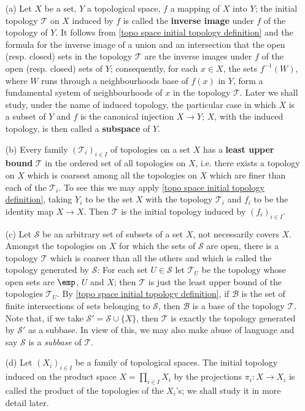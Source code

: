 \begin{example}
\mbox{}
\begin{enumerate}
\item[(a)] Let $X$ be a set, $Y$ a topological space, $f$ a mapping of $X$ into $Y$; the initial topology $\mathcal{T}$ on $X$ induced by $f$ is called the \textbf{inverse image} under $f$ of the topology of $Y$. It follows from \cref{topo space initial topology definition} and the formula for the inverse image of a union and an intersection that the open (resp. closed) sets in the topology $\mathcal{T}$ are the inverse images under $f$ of the open (resp. closed) sets of $Y$; consequently, for each $x\in X$, the sets $f^{-1}(W)$, where $W$ runs through a neighbourhoods base of $f(x)$ in $Y$, form a fundamental system of neighbourhoods of $x$ in the topology $\mathcal{T}$. Later we shall study, under the name of induced topology, the particular case in which $X$ is a subset of $Y$ and $f$ is the canonical injection $X\to Y$; $X$, with the induced topology, is then called a \textbf{subspace} of $Y$.
\item[(b)] Every family $(\mathcal{T}_i)_{i\in I}$ of topologies on a set $X$ has a \textbf{least upper bound} $\mathcal{T}$ in the ordered set of all topologies on $X$, i.e. there exists a topology on $X$ which is coarsest among all the topologies on $X$ which are finer than each of the $\mathcal{T}_i$. To see this we may apply \cref{topo space initial topology definition}, taking $Y_i$ to be the set $X$ with the topology $\mathcal{T}_i$ and $f_i$ to be the identity map $X\to X$. Then $\mathcal{T}$ is the initial topology induced by $(f_i)_{i\in I}$.
\item[(c)] Let $\mathcal{S}$ be an arbitrary set of subsets of a set $X$, not necessarily covers $X$. Amongst the topologies on $X$ for which the sets of $\mathcal{S}$ are open, there is a topology $\mathcal{T}$ which is coarser than all the others and which is called the topology generated by $\mathcal{S}$: For each set $U\in\mathcal{S}$ let $\mathcal{T}_U$ be the topology whose open sets are $\emp$, $U$ and $X$; then $\mathcal{T}$ is just the least upper bound of the topologies $\mathcal{T}_U$. By \cref{topo space initial topology definition}, if $\mathcal{B}$ is the set of finite intersections of sets belonging to $\mathcal{S}$, then $\mathcal{B}$ is a base of the topology $\mathcal{T}$. Note that, if we take $\mathcal{S}'=\mathcal{S}\cup\{X\}$, then $\mathcal{T}$ is exactly the topology generated by $\mathcal{S}'$ as a subbase. In view of this, we may also make abuse of language and say $\mathcal{S}$ is a \textit{subbase} of $\mathcal{T}$.
\item[(d)] Let $(X_i)_{i\in I}$ be a family of topological spaces. The initial topology induced on the product space $X=\prod_{i\in I}X_i$ by the projections $\pi_i:X\to X_i$ is called the product of the topologies of the $X_i$'s; we shall study it in more detail later.
\end{enumerate}
\end{example}
